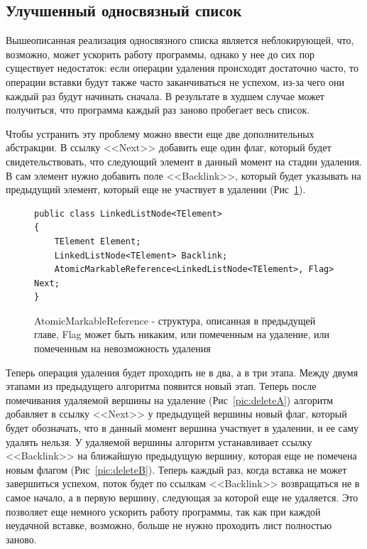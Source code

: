\documentclass[12pt]{article}
\begin{document}
{			\subsection{Улучшенный односвязный список}
				\par Вышеописанная реализация односвязного списка является неблокирующей, что, возможно, может ускорить работу программы, однако у нее до сих пор существует недостаток: если операции удаления происходят достаточно часто, то операции вставки будут также часто заканчиваться не успехом, из-за чего они каждый раз будут начинать сначала. В результате в худшем случае может получиться, что программа каждый раз заново пробегает весь список.
				\par Чтобы устранить эту проблему можно ввести еще две дополнительных абстракции. В ссылку <<Next>> добавить еще один флаг, который будет свидетельствовать, что следующий элемент в данный момент на стадии удаления. В сам элемент нужно добавить поле <<Backlink>>, который будет указывать на предыдущий элемент, который еще не участвует в удалении (Рис~\ref{pic:backlink}). 
				\begin{figure}[h]
					\begin{lstlisting}
public class LinkedListNode<TElement>
{
	TElement Element;
	LinkedListNode<TElement> Backlink;
	AtomicMarkableReference<LinkedListNode<TElement>, Flag> Next;
}
					\end{lstlisting}
					\caption{AtomicMarkableReference - структура, описанная в предыдущей главе, Flag может быть никаким, или помеченным на удаление, или помеченным на невозможность удаления}
					\label{pic:backlink}
				\end{figure}
				Теперь операция удаления будет проходить не в два, а в три этапа. Между двумя этапами из предыдущего алгоритма появится новый этап. Теперь после помечивания удаляемой вершины на удаление (Рис~\ref{pic:deleteA}) алгоритм добавляет в ссылку <<Next>> у предыдущей вершины новый флаг, который будет обозначать, что в данный момент вершина участвует в удалении, и ее саму удалять нельзя. У удаляемой вершины алгоритм устанавливает ссылку <<Backlink>> на ближайшую предыдущую вершину, которая еще не помечена новым флагом (Рис~\ref{pic:deleteB}). Теперь каждый раз, когда вставка не может завершиться успехом, поток будет по ссылкам <<Backlink>> возвращаться не в самое начало, а в первую вершину, следующая за которой еще не удаляется. Это позволяет еще немного ускорить работу программы, так как при каждой неудачной вставке, возможно, больше не нужно проходить лист полностью заново.
				\begin{figure}[h!]

\end{figure}}
\end{document}
